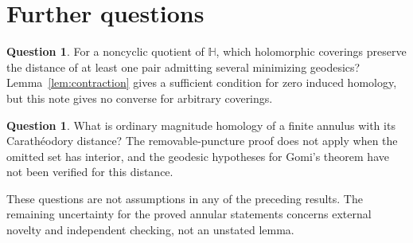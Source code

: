 \documentclass[12pt]{amsart}
\theoremstyle{definition}
\newtheorem{ques}[thm]{Question}
\theoremstyle{remark}
\numberwithin{equation}{section}
\begin{document}
\section{Further questions}\label{sec:questions}
\begin{ques}\label{ques:cover}
For a noncyclic quotient of $\mathbb H$, which holomorphic coverings preserve the distance of at least one pair admitting several minimizing geodesics? Lemma~\ref{lem:contraction} gives a sufficient condition for zero induced homology, but this note gives no converse for arbitrary coverings.
\end{ques}
\begin{ques}\label{ques:caratheodory}
What is ordinary magnitude homology of a finite annulus with its Carath\'eodory distance? The removable-puncture proof does not apply when the omitted set has interior, and the geodesic hypotheses for Gomi's theorem have not been verified for this distance.
\end{ques}
These questions are not assumptions in any of the preceding results. The remaining uncertainty for the proved annular statements concerns external novelty and independent checking, not an unstated lemma.
\end{document}
